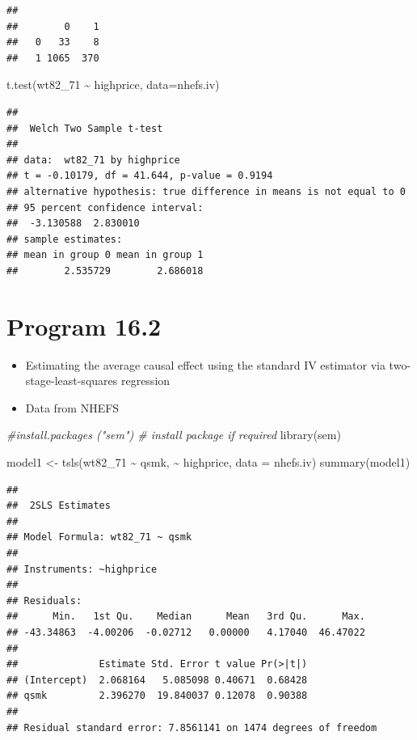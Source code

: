 \documentclass[
  10pt,
]{book}
\newenvironment{Shaded}{\begin{snugshade}}{\end{snugshade}}
\newcommand{\AttributeTok}[1]{\textcolor[rgb]{0.77,0.63,0.00}{#1}}
\newcommand{\CommentTok}[1]{\textcolor[rgb]{0.56,0.35,0.01}{\textit{#1}}}
\newcommand{\FunctionTok}[1]{\textcolor[rgb]{0.00,0.00,0.00}{#1}}
\newcommand{\NormalTok}[1]{#1}
\newcommand{\OtherTok}[1]{\textcolor[rgb]{0.56,0.35,0.01}{#1}}
\newcommand{\SpecialCharTok}[1]{\textcolor[rgb]{0.00,0.00,0.00}{#1}}
\providecommand{\tightlist}{%
  \setlength{\itemsep}{0pt}\setlength{\parskip}{0pt}}
\begin{document}
\begin{verbatim}
##    
##        0    1
##   0   33    8
##   1 1065  370
\end{verbatim}

\begin{Shaded}
\begin{Highlighting}[]
\FunctionTok{t.test}\NormalTok{(wt82\_71 }\SpecialCharTok{\textasciitilde{}}\NormalTok{ highprice, }\AttributeTok{data=}\NormalTok{nhefs.iv)}
\end{Highlighting}
\end{Shaded}

\begin{verbatim}
## 
##  Welch Two Sample t-test
## 
## data:  wt82_71 by highprice
## t = -0.10179, df = 41.644, p-value = 0.9194
## alternative hypothesis: true difference in means is not equal to 0
## 95 percent confidence interval:
##  -3.130588  2.830010
## sample estimates:
## mean in group 0 mean in group 1 
##        2.535729        2.686018
\end{verbatim}

\hypertarget{program-16.2}{%
\section{Program 16.2}\label{program-16.2}}

\begin{itemize}
\tightlist
\item
  Estimating the average causal effect using the standard IV estimator via two-stage-least-squares regression
\item
  Data from NHEFS
\end{itemize}

\begin{Shaded}
\begin{Highlighting}[]
\CommentTok{\#install.packages ("sem") \# install package if required}
\FunctionTok{library}\NormalTok{(sem) }

\NormalTok{model1 }\OtherTok{\textless{}{-}} \FunctionTok{tsls}\NormalTok{(wt82\_71 }\SpecialCharTok{\textasciitilde{}}\NormalTok{ qsmk, }\SpecialCharTok{\textasciitilde{}}\NormalTok{ highprice, }\AttributeTok{data =}\NormalTok{ nhefs.iv)}
\FunctionTok{summary}\NormalTok{(model1)}
\end{Highlighting}
\end{Shaded}

\begin{verbatim}
## 
##  2SLS Estimates
## 
## Model Formula: wt82_71 ~ qsmk
## 
## Instruments: ~highprice
## 
## Residuals:
##      Min.   1st Qu.    Median      Mean   3rd Qu.      Max. 
## -43.34863  -4.00206  -0.02712   0.00000   4.17040  46.47022 
## 
##              Estimate Std. Error t value Pr(>|t|)
## (Intercept)  2.068164   5.085098 0.40671  0.68428
## qsmk         2.396270  19.840037 0.12078  0.90388
## 
## Residual standard error: 7.8561141 on 1474 degrees of freedom
\end{verbatim}
\end{document}
